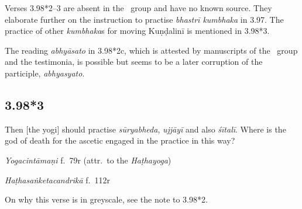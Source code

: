 \begin{ekdosis}
\begin{philcomm}[hp03_098_2]
Verses 3.98*2–3 are absent in the \textalpha\ group and have no known source. They elaborate further on the instruction to practise \emph{bhastrī kumbhaka} in 3.97. The practice of other \emph{kumbhaka}s for moving Kuṇḍalinī is mentioned in 3.98*3. \lb

The reading \emph{abhyāsato} in 3.98*2c, which is attested by manuscripts of the \textgamma\ group and the testimonia, is possible but seems to be a later corruption of the participle, \emph{abhyasyato}.
\end{philcomm}


\subsection*{3.98*3}
\begin{translation}[hp03_098_3]
Then [the yogi] should practise \emph{sūryabheda}, \emph{ujjāyī} and also \emph{śītalī}. Where is the god of death for the ascetic engaged in the practice in this way?
\end{translation}


\begin{testimonia}[hp03_098_3]
\emph{Yogacintāmaṇi} f.~79r (attr.~to the \emph{Haṭhayoga})
\begin{versinnote}
\end{versinnote}

\emph{Haṭhasaṅketacandrikā} f.~112r
\begin{versinnote}
\end{versinnote}
\end{testimonia}

\begin{philcomm}[hp03_098_3]
On why this verse is in greyscale, see the note to 3.98*2.


\end{philcomm}
\end{ekdosis}
